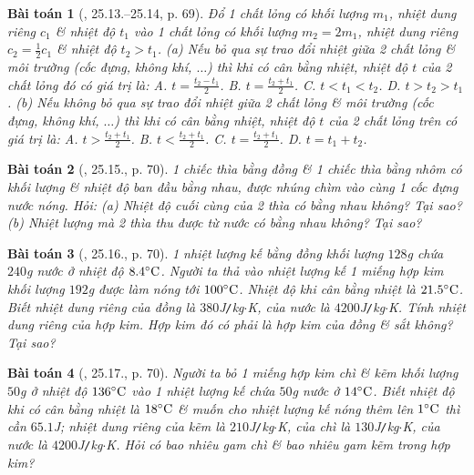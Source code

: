 \documentclass{article}
\newtheorem{baitoan}{Bài toán}
\begin{document}
\begin{baitoan}[\cite{SBT_Vat_Ly_8}, 25.13.--25.14, p. 69]
	Đổ 1 chất lỏng có khối lượng $m_1$, nhiệt dung riêng $c_1$ \& nhiệt độ $t_1$ vào 1 chất lỏng có khối lượng $m_2 = 2m_1$, nhiệt dung riêng $c_2 = \frac{1}{2}c_1$ \& nhiệt độ $t_2 > t_1$. (a) Nếu bỏ qua sự trao đổi nhiệt giữa 2 chất lỏng \& môi trường (cốc đựng, không khí, $\ldots$) thì khi có cân bằng nhiệt, nhiệt độ $t$ của 2 chất lỏng đó có giá trị là: {\sf A.} $t = \frac{t_2 - t_1}{2}$. {\sf B.} $t = \frac{t_2 + t_1}{2}$. {\sf C.} $t < t_1 < t_2$. {\sf D.} $t > t_2 > t_1$. (b) Nếu không bỏ qua sự trao đổi nhiệt giữa 2 chất lỏng \& môi trường (cốc đựng, không khí, $\ldots$) thì khi có cân bằng nhiệt, nhiệt độ $t$ của 2 chất lỏng trên có giá trị là: {\sf A.} $t > \frac{t_2 + t_1}{2}$. {\sf B.} $t < \frac{t_2 + t_1}{2}$. {\sf C.} $t = \frac{t_2 + t_1}{2}$. {\sf D.} $t = t_1 + t_2$.
\end{baitoan}

\begin{baitoan}[\cite{SBT_Vat_Ly_8}, 25.15., p. 70]
	1 chiếc thìa bằng đồng \& 1 chiếc thìa bằng nhôm có khối lượng \& nhiệt độ ban đầu bằng nhau, được nhúng chìm vào cùng 1 cốc đựng nước nóng. Hỏi: (a) Nhiệt độ cuối cùng của 2 thìa có bằng nhau không? Tại sao? (b) Nhiệt lượng mà 2 thìa thu được từ nước có bằng nhau không? Tại sao?
\end{baitoan}

\begin{baitoan}[\cite{SBT_Vat_Ly_8}, 25.16., p. 70]
	1 nhiệt lượng kế bằng đồng khối lượng $128$\emph{g} chứa $240$\emph{g} nước ở nhiệt độ $8.4^\circ{\rm C}$. Người ta thả vào nhiệt lượng kế 1 miếng hợp kim khối lượng $192$\emph{g} được làm nóng tới $100^\circ{\rm C}$. Nhiệt độ khi cân bằng nhiệt là $21.5^\circ{\rm C}$. Biết nhiệt dung riêng của đồng là $380$\emph{J\texttt{/}kg$\cdot$K}, của nước là $4200$\emph{J\texttt{/}kg$\cdot$K}. Tính nhiệt dung riêng của hợp kim. Hợp kim đó có phải là hợp kim của đồng \& sắt không? Tại sao?
\end{baitoan}

\begin{baitoan}[\cite{SBT_Vat_Ly_8}, 25.17., p. 70]
	Người ta bỏ 1 miếng hợp kim chì \& kẽm khối lượng $50$\emph{g} ở nhiệt độ $136^\circ{\rm C}$ vào 1 nhiệt lượng kế chứa $50$\emph{g} nước ở $14^\circ{\rm C}$. Biết nhiệt độ khi có cân bằng nhiệt là $18^\circ{\rm C}$ \& muốn cho nhiệt lượng kế nóng thêm lên $1^\circ{\rm C}$ thì cần $65.1$\emph{J}; nhiệt dung riêng của kẽm là $210$\emph{J\texttt{/}kg$\cdot$K}, của chì là $130$\emph{J\texttt{/}kg$\cdot$K}, của nước là $4200$\emph{J\texttt{/}kg$\cdot$K}. Hỏi có bao nhiêu gam chì \& bao nhiêu gam kẽm trong hợp kim?
\end{baitoan}
\end{document}
